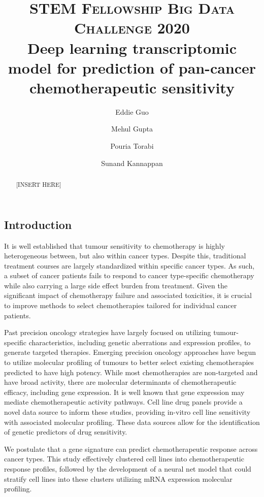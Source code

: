 \documentclass[10pt, letterpaper]{article}
\title{
    \usefont{OT1}{bch}{b}{n}
    \normalfont \normalsize \textsc{STEM Fellowship Big Data Challenge 2020} \\ [10pt]
    \huge Deep learning transcriptomic model for prediction of pan-cancer chemotherapeutic sensitivity \\
}
\author[1]{Eddie Guo}
\author[2]{Mehul Gupta}
\author[1]{Pouria Torabi}
\author[2]{Sunand Kannappan}
\affil[1]{University of Alberta}
\affil[2]{University of Calgary}
\begin{document}
\maketitle

\begin{multicols}{2}
\begin{abstract}
    [INSERT HERE]
\end{abstract} \vspace{1em}



\section{Introduction}
It is well established that tumour sensitivity to chemotherapy is highly heterogeneous between, but also within cancer types. Despite this, traditional treatment courses are largely standardized within specific cancer types. As such, a subset of cancer patients fails to respond to cancer type-specific chemotherapy while also carrying a large side effect burden from treatment. Given the significant impact of chemotherapy failure and associated toxicities, it is crucial to improve methods to select chemotherapies tailored for individual cancer patients.

Past precision oncology strategies have largely focused on utilizing tumour-specific characteristics, including genetic aberrations and expression profiles, to generate targeted therapies. Emerging precision oncology approaches have begun to utilize molecular profiling of tumours to better select existing chemotherapies predicted to have high potency. While most chemotherapies are non-targeted and have broad activity, there are molecular determinants of chemotherapeutic efficacy, including gene expression. It is well known that gene expression may mediate chemotherapeutic activity pathways. Cell line drug panels provide a novel data source to inform these studies, providing in-vitro cell line sensitivity with associated molecular profiling. These data sources allow for the identification of genetic predictors of drug sensitivity.

We postulate that a gene signature can predict chemotherapeutic response across cancer types. This study effectively clustered cell lines into chemotherapeutic response profiles, followed by the development of a neural net model that could stratify cell lines into these clusters utilizing mRNA expression molecular profiling.



\end{multicols}
\end{document}
